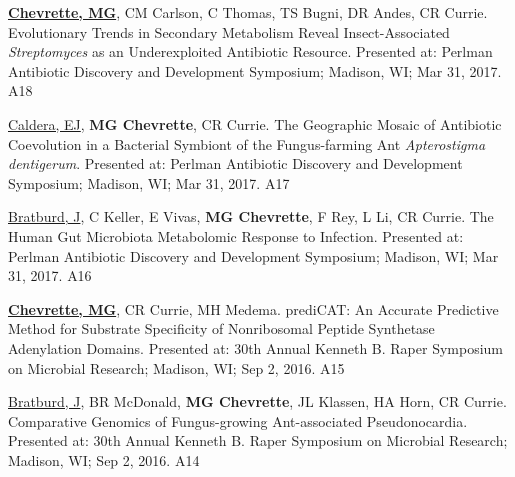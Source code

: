 

\begin{cvpubs}

  \cvpub
    {\underline{\textbf{Chevrette, MG}}, CM Carlson, C Thomas, TS Bugni, DR Andes, CR Currie.  Evolutionary Trends in Secondary Metabolism Reveal Insect-Associated \textit{Streptomyces} as an Underexploited Antibiotic Resource.  Presented at: Perlman Antibiotic Discovery and Development Symposium; Madison, WI; Mar 31, 2017.} %
    {A18} %

  \cvpub
    {\underline{Caldera, EJ}, \textbf{MG Chevrette}, CR Currie.  The Geographic Mosaic of Antibiotic Coevolution in a Bacterial Symbiont of the Fungus-farming Ant \textit{Apterostigma dentigerum}.  Presented at: Perlman Antibiotic Discovery and Development Symposium; Madison, WI; Mar 31, 2017.} %
    {A17} %

  \cvpub
    {\underline{Bratburd, J}, C Keller, E Vivas, \textbf{MG Chevrette}, F Rey, L Li, CR Currie.  The Human Gut Microbiota Metabolomic Response to Infection.  Presented at: Perlman Antibiotic Discovery and Development Symposium; Madison, WI; Mar 31, 2017.} %
    {A16} %

  \cvpub
    {\textbf{\underline{Chevrette, MG}}, CR Currie, MH Medema.  prediCAT: An Accurate Predictive Method for Substrate Specificity of Nonribosomal Peptide Synthetase Adenylation Domains.  Presented at: 30th Annual Kenneth B. Raper Symposium on Microbial Research; Madison, WI; Sep 2, 2016.} %
    {A15} %

  \cvpub
    {\underline{Bratburd, J}, BR McDonald, \textbf{MG Chevrette}, JL Klassen, HA Horn, CR Currie.  Comparative Genomics of Fungus-growing Ant-associated Pseudonocardia.  Presented at: 30th Annual Kenneth B. Raper Symposium on Microbial Research; Madison, WI; Sep 2, 2016.} %
    {A14} %
    

\end{cvpubs}
